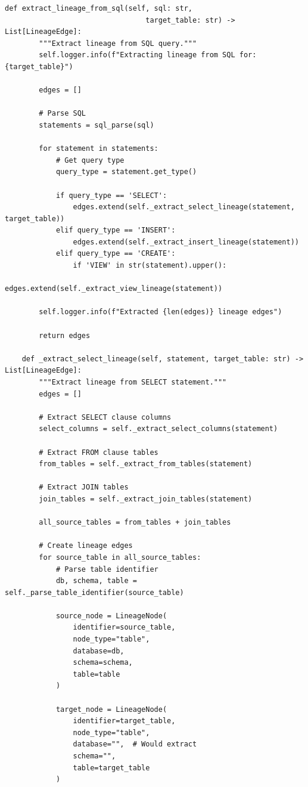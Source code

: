 \begin{lstlisting}[style=python, caption=LineageTracker with Column-Level Dependencies]
    def extract_lineage_from_sql(self, sql: str,
                                 target_table: str) -> List[LineageEdge]:
        """Extract lineage from SQL query."""
        self.logger.info(f"Extracting lineage from SQL for: {target_table}")

        edges = []

        # Parse SQL
        statements = sql_parse(sql)

        for statement in statements:
            # Get query type
            query_type = statement.get_type()

            if query_type == 'SELECT':
                edges.extend(self._extract_select_lineage(statement, target_table))
            elif query_type == 'INSERT':
                edges.extend(self._extract_insert_lineage(statement))
            elif query_type == 'CREATE':
                if 'VIEW' in str(statement).upper():
                    edges.extend(self._extract_view_lineage(statement))

        self.logger.info(f"Extracted {len(edges)} lineage edges")

        return edges

    def _extract_select_lineage(self, statement, target_table: str) -> List[LineageEdge]:
        """Extract lineage from SELECT statement."""
        edges = []

        # Extract SELECT clause columns
        select_columns = self._extract_select_columns(statement)

        # Extract FROM clause tables
        from_tables = self._extract_from_tables(statement)

        # Extract JOIN tables
        join_tables = self._extract_join_tables(statement)

        all_source_tables = from_tables + join_tables

        # Create lineage edges
        for source_table in all_source_tables:
            # Parse table identifier
            db, schema, table = self._parse_table_identifier(source_table)

            source_node = LineageNode(
                identifier=source_table,
                node_type="table",
                database=db,
                schema=schema,
                table=table
            )

            target_node = LineageNode(
                identifier=target_table,
                node_type="table",
                database="",  # Would extract
                schema="",
                table=target_table
            )


\end{lstlisting}
